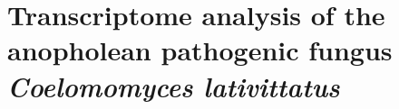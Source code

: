 \chapter{Transcriptome analysis of the anopholean pathogenic fungus \textit{Coelomomyces lativittatus}}
\label{chap:ClatTranscriptome}
